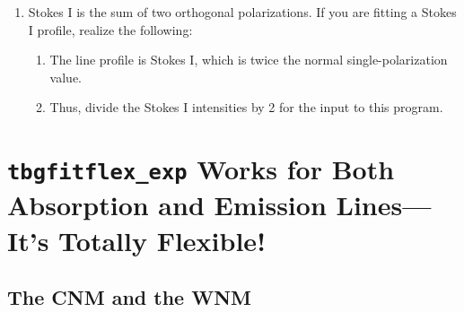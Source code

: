 \documentclass[preprint]{aastex}
\begin{document}
\begin{enumerate}
\begin{enumerate}
\end{enumerate}

\item Stokes I is the sum of two orthogonal polarizations. If you are
  fitting a Stokes I profile, realize the following: \begin{enumerate}

\item The line profile is Stokes I, which is twice the normal
  single-polarization value.

\item Thus, divide the Stokes I intensities by 2 for the input to this
  program. 
\end{enumerate}
\end{enumerate}

\section{{\tt tbgfitflex\_exp} Works for Both Absorption and Emission Lines---It's Totally Flexible!}

\subsection{The CNM and the WNM}
\end{document}
